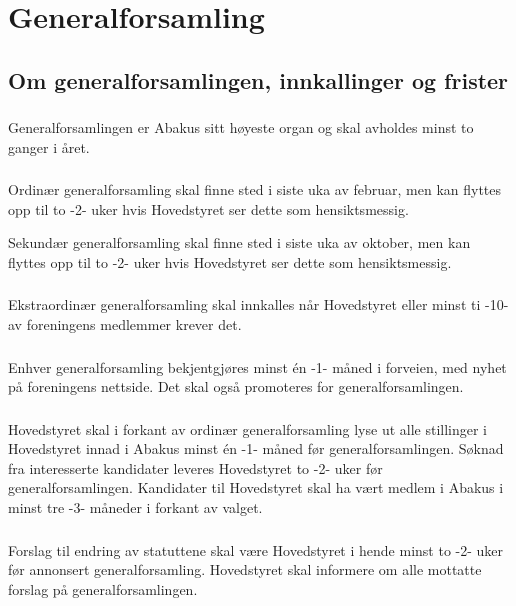 \section{Generalforsamling}
\subsection{Om generalforsamlingen, innkallinger og frister}
\subsubsection{}
Generalforsamlingen er Abakus sitt høyeste organ og skal avholdes minst to
ganger i året.

\subsubsection{}
Ordinær generalforsamling skal finne sted i siste uka av februar,
men kan flyttes opp til to -2- uker hvis Hovedstyret ser dette som hensiktsmessig.

Sekundær generalforsamling skal finne sted i siste uka av oktober, men kan flyttes opp til to -2-
uker hvis Hovedstyret ser dette som hensiktsmessig.

\subsubsection{}
Ekstraordinær generalforsamling skal innkalles når Hovedstyret eller minst
ti -10- av foreningens medlemmer krever det.

\subsubsection{}
Enhver generalforsamling bekjentgjøres minst én -1- måned i forveien, med
nyhet på foreningens nettside. Det skal også promoteres for generalforsamlingen.

\subsubsection{}
Hovedstyret skal i forkant av ordinær generalforsamling lyse ut alle stillinger i Hovedstyret
innad i Abakus minst én -1- måned før generalforsamlingen.
Søknad fra interesserte kandidater leveres Hovedstyret to -2- uker før
generalforsamlingen. Kandidater til Hovedstyret skal ha vært medlem
i Abakus i minst tre -3- måneder i forkant av valget.

\subsubsection{}
Forslag til endring av statuttene skal være Hovedstyret i hende minst to -2-
uker før annonsert generalforsamling. Hovedstyret skal informere om alle
mottatte forslag på generalforsamlingen.

